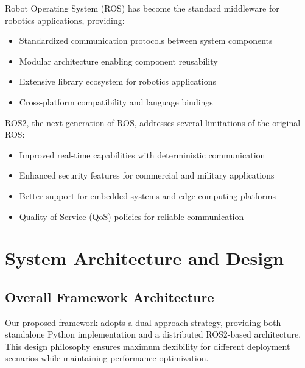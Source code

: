 \documentclass[12pt,a4paper]{article}
\begin{document}
Robot Operating System (ROS) has become the standard middleware for robotics applications, providing:

\begin{itemize}
    \item Standardized communication protocols between system components
    \item Modular architecture enabling component reusability
    \item Extensive library ecosystem for robotics applications
    \item Cross-platform compatibility and language bindings
\end{itemize}

ROS2, the next generation of ROS, addresses several limitations of the original ROS:

\begin{itemize}
    \item Improved real-time capabilities with deterministic communication
    \item Enhanced security features for commercial and military applications
    \item Better support for embedded systems and edge computing platforms
    \item Quality of Service (QoS) policies for reliable communication
\end{itemize}

\section{System Architecture and Design}

\subsection{Overall Framework Architecture}

Our proposed framework adopts a dual-approach strategy, providing both standalone Python implementation and a distributed ROS2-based architecture. This design philosophy ensures maximum flexibility for different deployment scenarios while maintaining performance optimization.
\end{document}
